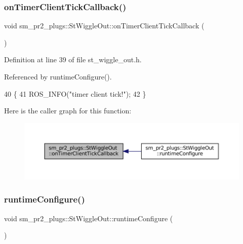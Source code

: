 \subsubsection{\texorpdfstring{on\+Timer\+Client\+Tick\+Callback()}{onTimerClientTickCallback()}}
{\footnotesize\ttfamily void sm\+\_\+pr2\+\_\+plugs\+::\+St\+Wiggle\+Out\+::on\+Timer\+Client\+Tick\+Callback (\begin{DoxyParamCaption}{ }\end{DoxyParamCaption})\hspace{0.3cm}{\ttfamily [inline]}}



Definition at line 39 of file st\+\_\+wiggle\+\_\+out.\+h.



Referenced by runtime\+Configure().


\begin{DoxyCode}
40     \{
41         ROS\_INFO(\textcolor{stringliteral}{"timer client tick!"});
42     \}
\end{DoxyCode}
Here is the caller graph for this function\+:
\nopagebreak
\begin{figure}[H]
\begin{center}
\leavevmode
\includegraphics[width=350pt]{structsm__pr2__plugs_1_1StWiggleOut_a5a3ebd3e28a35bbcb63600cb4f5e5265_icgraph}
\end{center}
\end{figure}
\mbox{\label{structsm__pr2__plugs_1_1StWiggleOut_a6fa24859d089ed61fcea478ed3b23cce}} 
\subsubsection{\texorpdfstring{runtime\+Configure()}{runtimeConfigure()}}
{\footnotesize\ttfamily void sm\+\_\+pr2\+\_\+plugs\+::\+St\+Wiggle\+Out\+::runtime\+Configure (\begin{DoxyParamCaption}{ }\end{DoxyParamCaption})\hspace{0.3cm}{\ttfamily [inline]}}



